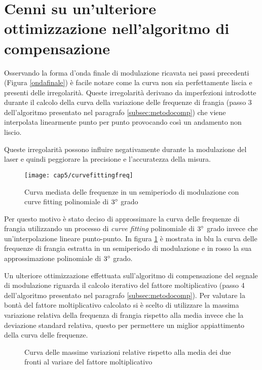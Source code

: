 \section{Cenni su un'ulteriore ottimizzazione nell'algoritmo di compensazione}
Osservando la forma d'onda finale di modulazione ricavata nei passi precedenti (Figura \ref{ondafinale}) è facile notare come la curva non sia perfettamente liscia e presenti delle irregolarità.
Queste irregolarità derivano da imperfezioni introdotte durante il calcolo della curva della variazione delle frequenze di frangia (passo $3$ dell'algoritmo presentato nel paragrafo \ref{subsec:metodocomp}) che viene interpolata linearmente punto per punto provocando così un andamento non liscio. 

Queste irregolarità possono influire negativamente durante la modulazione del laser e quindi peggiorare la precisione e l'accuratezza della misura. 
\begin{figure}  
  \begin{center}
    \texttt{[image: cap5/curvefittingfreq]}
    \caption{Curva mediata delle frequenze in un semiperiodo di modulazione con curve fitting polinomiale di $3\degree$ grado}
    \label{curvefittingfreq}
  \end{center}
\end{figure}

Per questo motivo è stato deciso di approssimare la curva delle frequenze di frangia utilizzando un processo di \textit{curve fitting} polinomiale di $3\degree$ grado invece che un'interpolazione lineare punto-punto. In figura \ref{curvefittingfreq} è mostrata in blu la curva delle frequenze di frangia estratta in un semiperiodo di modulazione e in rosso la sua approssimazione polinomiale di $3\degree$ grado.

Un ulteriore ottimizzazione effettuata sull'algoritmo di compensazione del segnale di modulazione riguarda il calcolo iterativo del fattore moltiplicativo (passo 4 dell'algoritmo presentato nel paragrafo \ref{subsec:metodocomp}). Per valutare la bontà del fattore moltiplicativo calcolato si è scelto di utilizzare la massima variazione relativa della frequenza di frangia rispetto alla media invece che la deviazione standard relativa, questo per permettere un miglior appiattimento della curva delle frequenze.

\begin{figure}
\centering
{}
\hspace{5mm}
\caption{Curva delle massime variazioni relative rispetto alla media dei due fronti al variare del fattore moltiplicativo}\label{mulfactnew}
\end{figure}

